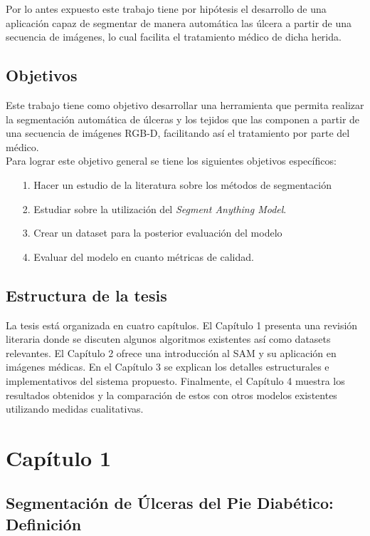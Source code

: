 \documentclass[12pt]{article}
\begin{document}
	Por lo antes expuesto este trabajo tiene por hip\'otesis el desarrollo de una aplicaci\'on capaz de segmentar de manera autom\'atica las \'ulcera a partir de una secuencia de im\'agenes, lo cual facilita el tratamiento m\'edico de dicha herida.
	
	\subsection{Objetivos}
	Este trabajo tiene como objetivo desarrollar una herramienta que permita realizar la segmentación automática de úlceras y los tejidos que las componen a partir de una secuencia de imágenes RGB-D, facilitando así el tratamiento por parte del médico.	
	\\
	
	
	Para lograr este objetivo general se tiene los siguientes objetivos espec\'ificos:
	
	\begin{itemize}
		\item[1.] Hacer un estudio de la literatura sobre los m\'etodos de segmentaci\'on
		\item[2.] Estudiar sobre la utilizaci\'on del \textit{Segment Anything Model}.
		\item[3.] Crear un dataset para la posterior evaluaci\'on del modelo
		\item[4.] Evaluar del modelo en cuanto m\'etricas de calidad. 
	\end{itemize}
	
	\subsection{Estructura de la tesis}
	La tesis está organizada en cuatro capítulos. El Capítulo 1 presenta una revisión literaria donde se discuten algunos algoritmos existentes así como datasets relevantes. El Capítulo 2 ofrece una introducción al SAM y su aplicación en imágenes médicas. En el Capítulo 3 se explican los detalles estructurales e implementativos del sistema propuesto. Finalmente, el Capítulo 4 muestra los resultados obtenidos y la comparaci\'on de estos con otros modelos existentes utilizando medidas cualitativas.

	
	
	
	\newpage
	
	\section{Cap\'itulo 1}
		\subsection{Segmentación de Úlceras del Pie Diabético: Definición}
		
\end{document}
